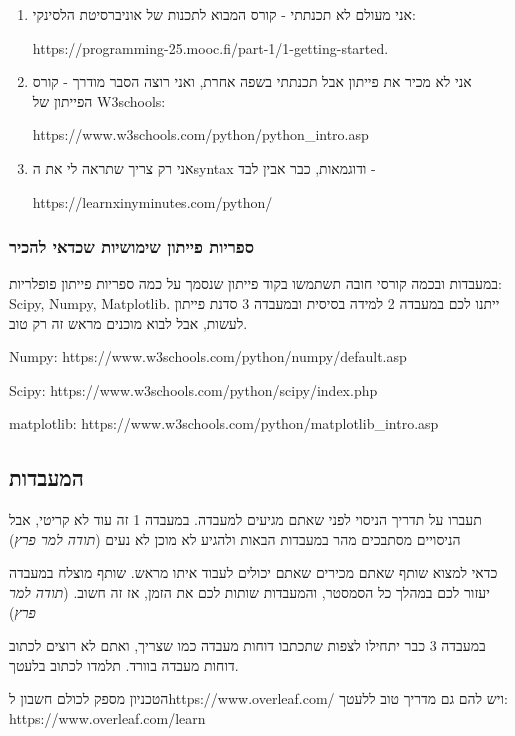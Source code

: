 \documentclass[a4paper,12pt]{article}
\begin{document}
\begin{enumerate}
    \item אני מעולם לא תכנתתי - קורס המבוא לתכנות של אוניברסיטת הלסינקי: 
    
    \textenglish{https://programming-25.mooc.fi/part-1/1-getting-started}.  
    \item אני לא מכיר את פייתון אבל תכנתתי בשפה אחרת, ואני רוצה הסבר מודרך - קורס הפייתון של \textenglish{W3schools}: 
    
    \textenglish{https://www.w3schools.com/python/python\_intro.asp}
    \item אני רק צריך שתראה לי את ה\textenglish{syntax} ודוגמאות, כבר אבין לבד - 
    
    \textenglish{https://learnxinyminutes.com/python/}
\end{enumerate}

\subsubsection{ספריות פייתון שימושיות שכדאי להכיר}

במעבדות ובכמה קורסי חובה תשתמשו בקוד פייתון שנסמך על כמה ספריות פייתון פופלריות: \textenglish{Scipy, Numpy, Matplotlib}. ייתנו לכם במעבדה 2 למידה בסיסית ובמעבדה 3 סדנת פייתון לעשות, אבל לבוא מוכנים מראש זה רק טוב.

\textenglish{Numpy: https://www.w3schools.com/python/numpy/default.asp}

\textenglish{Scipy: https://www.w3schools.com/python/scipy/index.php}

\textenglish{matplotlib: https://www.w3schools.com/python/matplotlib\_intro.asp}

\subsection{המעבדות}

תעברו על תדריך הניסוי לפני שאתם מגיעים למעבדה. במעבדה 1 זה עוד לא קריטי, אבל הניסויים מסתבכים מהר במעבדות הבאות ולהגיע לא מוכן לא נעים (\emph{תודה למר פרץ})

כדאי למצוא שותף שאתם מכירים שאתם יכולים לעבוד איתו מראש. שותף מוצלח במעבדה יעזור לכם במהלך כל הסמסטר, והמעבדות שותות לכם את הזמן, אז זה חשוב. (\emph{תודה למר פרץ})

במעבדה 3 כבר יתחילו לצפות שתכתבו דוחות מעבדה כמו שצריך, ואתם לא רוצים לכתוב דוחות מעבדה בוורד. תלמדו לכתוב בלעטך.

הטכניון מספק לכולם חשבון ל\textenglish{https://www.overleaf.com/} ויש להם גם מדריך טוב ללעטך:
\textenglish{https://www.overleaf.com/learn}
\end{document}
